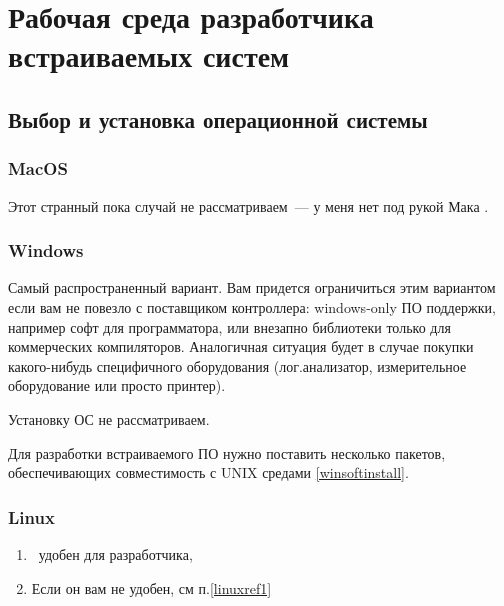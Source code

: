 \chapter{Рабочая среда разработчика встраиваемых систем}




\section{Выбор и установка операционной системы}

\subsection{MacOS}

Этот странный пока случай не рассматриваем\ --- у меня нет под рукой Мака \smiley.

\subsection{Windows}

Самый распространенный вариант. Вам придется ограничиться этим вариантом если вам не повезло
с поставщиком контроллера: windows-only ПО поддержки, например софт для программатора, или
внезапно библиотеки только для коммерческих компиляторов. Аналогичная ситуация будет в случае
покупки какого-нибудь специфичного оборудования (лог.анализатор, измерительное 
оборудование или просто принтер).

Установку ОС не рассматриваем.


Для разработки встраиваемого ПО нужно поставить несколько пакетов, обеспечивающих
совместимость с UNIX средами \ref{winsoftinstall}.

\subsection{Linux}\label{linux}

\begin{enumerate}
\item \label{linuxref1}\linux\ удобен для разработчика, 
\item Если он вам не удобен, см п.\ref{linuxref1}
\end{enumerate}


